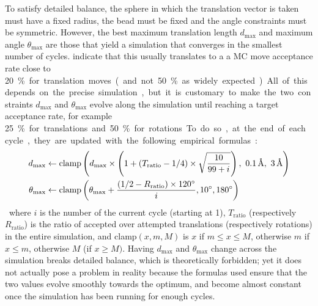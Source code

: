 \documentclass[main.tex]{subfiles}
\begin{document}
To satisfy detailed balance, the sphere in which the translation vector is taken must have a fixed radius, the bead must be fixed and the angle constraints must be symmetric. However, the best maximum translation length $d_{\max}$ and maximum angle $\theta_{\max}$ are those that yield a simulation that converges in the smallest number of cycles. \textcite{FrenkelSmit} indicate that this usually translates to a a MC move acceptance rate close to \qty{20}\% for translation moves (and not \qty{50}\% as widely expected). All of this depends on the precise simulation, but it is customary to make the two constraints $d_{\max}$ and $\theta_{\max}$ evolve along the simulation until reaching a target acceptance rate, for example \qty{25}\% for translations and \qty{50}\% for rotations. To do so, at the end of each cycle, they are updated with the following empirical formulas:
\[\begin{split}
	d_{\max} &\gets \text{clamp}\paren{
		d_{\max}\times\paren{1+\paren{T_\text{ratio} - 1/4}\times\sqrt{\frac{10}{99+i}}},\ \qty{0.1}{\angstrom},\ \qty{3}{\angstrom}
	}\\
	\theta_{\max} &\gets \text{clamp}\paren{\theta_{\max} + \frac{\paren{1/2 - R_\text{ratio}}\times\qty{120}\degree}i, \qty{10}\degree, \qty{180}\degree}
\end{split}\]
where $i$ is the number of the current cycle (starting at 1), $T_\text{ratio}$ (respectively $R_\text{ratio}$) is the ratio of accepted over attempted translations (respectively rotations) in the entire simulation, and clamp$(x, m, M)$ is $x$ if $m\le x \le M$, otherwise $m$ if $x\le m$, otherwise $M$ (if $x\ge M)$. Having $d_{\max}$ and $\theta_{\max}$ change across the simulation breaks detailed balance, which is theoretically forbidden; yet it does not actually pose a problem in reality because the formulas used ensure that the two values evolve smoothly towards the optimum, and become almost constant once the simulation has been running for enough cycles.
\end{document}
